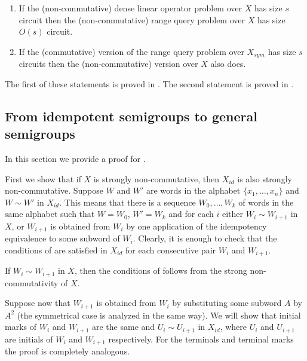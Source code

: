\documentclass{toc}
\begin{document}
\begin{enumerate}
	\item If the (non-commutative) dense linear operator problem over $X$ has size $s$
	circuit then the (non-commutative)
	range query
	problem over $X$ has size
	$O(s)$ circuit.
	\item If the (commutative) version of the
	range query
	problem over $X_{sym}$ has
	size $s$ circuits then the (non-commutative) version over $X$ also does.
\end{enumerate}

The first of these statements is proved in  .
The second statement is proved in .

\subsection{From idempotent semigroups to general semigroups}\label{sec:noncommutative_extension}

In this section we provide a proof for .


First we show that if $X$ is strongly non-commutative, then $X_{id}$ is also strongly non-commutative.
Suppose $W$ and $W'$ are words in the alphabet $\{x_1,\ldots, x_n\}$ and $W \sim W'$ in $X_{id}$. This means that there is a sequence $W_0,\ldots, W_k$ of words in the same alphabet such that $W=W_0$, $W'=W_k$ and for each $i$ either $W_i \sim W_{i+1}$ in $X$, or $W_{i+1}$ is obtained from $W_i$ by one application of the idempotency equivalence to some subword of $W_i$. Clearly, it is enough to check that the conditions of  are satisfied in $X_{id}$ for each consecutive pair $W_i$ and $W_{i+1}$.

If $W_i \sim W_{i+1}$ in $X$, then the conditions of  follows from the strong non-commutativity of $X$.

Suppose now that $W_{i+1}$ is obtained from $W_{i}$ by substituting some subword $A$ by $A^2$ (the symmetrical case is analyzed in the same way). We will show that initial marks of $W_i$ and $W_{i+1}$ are the same and $U_{i} \sim U_{i+1}$ in $X_{id}$, where $U_{i}$ and $U_{i+1}$ are initials of $W_i$ and $W_{i+1}$ respectively. For the terminals and terminal marks the proof is completely analogous.
\end{document}
